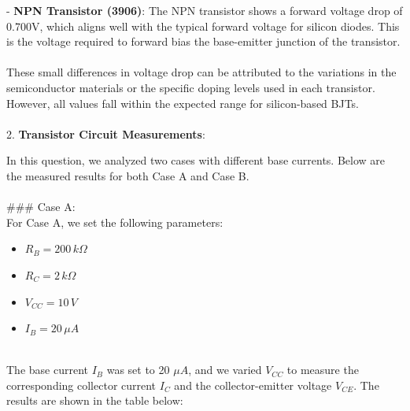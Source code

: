 \documentclass{article}
\begin{document}
- \textbf{NPN Transistor (3906)}: The NPN transistor shows a forward voltage drop of 0.700V, which aligns well with the typical forward voltage for silicon diodes. This is the voltage required to forward bias the base-emitter junction of the transistor.
\\ \\

These small differences in voltage drop can be attributed to the variations in the semiconductor materials or the specific doping levels used in each transistor. However, all values fall within the expected range for silicon-based BJTs.
 \\ \\ 

 
2. \textbf{Transistor Circuit Measurements}:

In this question, we analyzed two cases with different base currents. Below are the measured results for both Case A and Case B.
\\ \\ 
### Case A: \\ 
For Case A, we set the following parameters:
\begin{itemize}
    \item \( R_B = 200 \, k\Omega \)
    \item \( R_C = 2 \, k\Omega \)
    \item \( V_{CC} = 10 \, V \)
    \item \( I_B = 20 \, \mu A \)
\end{itemize}
\\
The base current \( I_B \) was set to 20 \(\mu A\), and we varied \( V_{CC} \) to measure the corresponding collector current \( I_C \) and the collector-emitter voltage \( V_{CE} \). The results are shown in the table below:
\end{document}
